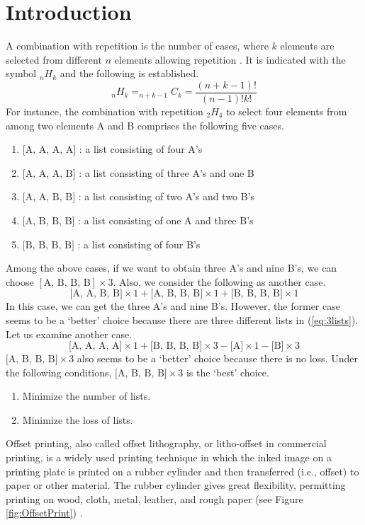 \documentclass[a4paper]{amsart}
\numberwithin{equation}{section} %
\numberwithin{figure}{section} %
\numberwithin{table}{section}
\theoremstyle{plain}
\theoremstyle{definition}
\theoremstyle{plain}
\theoremstyle{plain}
\theoremstyle{plain}
\theoremstyle{plain}
\theoremstyle{plain}
\begin{document}
\section{Introduction}\label{sec:intro}
A combination with repetition is the number of cases, where $k$ elements are selected from different $n$ elements allowing repetition \cite{Brualdi2004}. 
It is indicated with the symbol $_{n}H_{k}$ and the following is established.
\begin{equation}
	_{n}H_{k} = _{n+k-1}C_{k} = \frac{(n+k-1)!}{(n-1)!k!}
\end{equation}
For instance, the combination with repetition $_{2}H_{4}$ to select four elements from among two elements A and B comprises the following five cases.
\begin{enumerate}[(1)]
	\item $\textrm{[A, A, A, A]}$ : a list consisting of four A's
	\item $\textrm{[A, A, A, B]}$ : a list consisting of three A's and one B
	\item $\textrm{[A, A, B, B]}$ : a list consisting of two A's and two B's
	\item $\textrm{[A, B, B, B]}$ : a list consisting of one A and three B's
	\item $\textrm{[B, B, B, B]}$ : a list consisting of four B's
\end{enumerate}
Among the above cases, if we want to obtain three A's and nine B's, we can choose $[\textrm{A, B, B, B}] \times 3$. 
Also, we consider the following as another case.
\begin{equation}\label{eq:3lists}
	\textrm{[A, A, B, B]} \times 1 + \textrm{[A, B, B, B]} \times 1 + \textrm{[B, B, B, B]} \times 1
\end{equation}
In this case, we can get the three A's and nine B's. 
However, the former case seems to be a ‘better’ choice because there are three different lists in (\ref{eq:3lists}). 
Let us examine another case.
\begin{equation}
\textrm{[A, A, A, A]} \times 1 + \textrm{[B, B, B, B]} \times 3 - \textrm{[A]} \times 1 - \textrm{[B]} \times 3
\end{equation}
$\textrm{[A, B, B, B]} \times 3$ also seems to be a `better' choice because there is no loss. Under the following conditions, $\textrm{[A, B, B, B]} \times 3$ is the ‘best’ choice.
\begin{enumerate}[(1)]
	\item Minimize the number of lists.
	\item Minimize the loss of lists.
\end{enumerate}
Offset printing, also called offset lithography, or litho-offset in commercial printing, 
is a widely used printing technique in which the inked image on a printing plate is printed on a rubber cylinder and then transferred (i.e., offset) to paper or other material. 
The rubber cylinder gives great flexibility, permitting printing on wood, cloth, metal, leather, and rough paper (see Figure \ref{fig:OffsetPrint}) \cite{OffsetPrint}.
\end{document}

